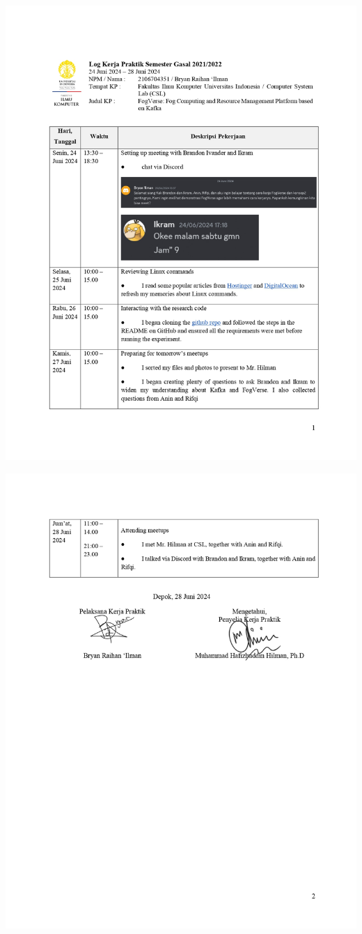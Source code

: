 \includegraphics[width=1\textwidth]{assets/pics/Log-4-CSL-Bryan Raihan Ilman-0001.jpg}

\includegraphics[width=1\textwidth]{assets/pics/Log-4-CSL-Bryan Raihan Ilman-0002.jpg}

